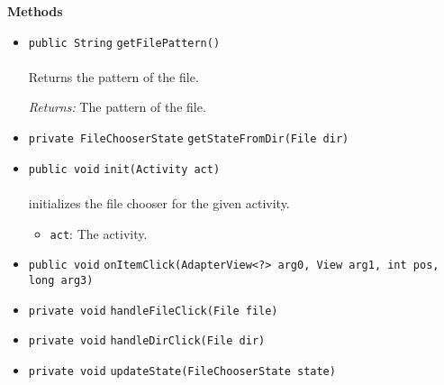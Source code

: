 \textbf{\sffamily Methods}
\begin{itemize}
\item \lstinline|public String| \lstinline|getFilePattern|\lstinline|()|\\ \\[-0.6em]
Returns the pattern of the file.

\emph{Returns:} The pattern of the file.

\item \lstinline|private FileChooserState| \lstinline|getStateFromDir|\lstinline|(File dir)| \\[-0.6em]




\item \lstinline|public void| \lstinline|init|\lstinline|(Activity act)|\\ \\[-0.6em]
initializes the file chooser for the given activity.
\begin{itemize}
\item \lstinline|act|: The activity.
\end{itemize}



\item \lstinline|public void| \lstinline|onItemClick|\lstinline|(AdapterView<?> arg0, View arg1, int pos, long arg3)| \\[-0.6em]




\item \lstinline|private void| \lstinline|handleFileClick|\lstinline|(File file)| \\[-0.6em]




\item \lstinline|private void| \lstinline|handleDirClick|\lstinline|(File dir)| \\[-0.6em]




\item \lstinline|private void| \lstinline|updateState|\lstinline|(FileChooserState state)| \\[-0.6em]




\end{itemize}

